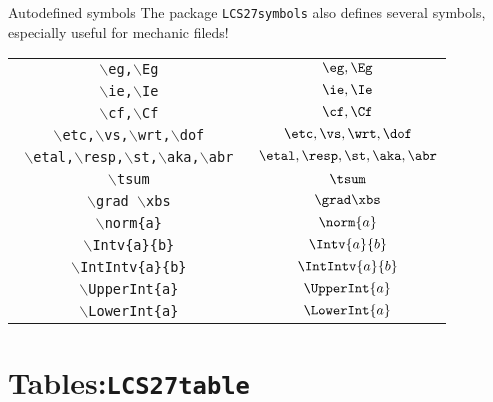 \documentclass[aspectratio=169]{beamer}
\begin{document}
\begin{frame}{Autodefined symbols}
The package \texttt{LCS27symbols} also defines several symbols, especially useful for mechanic fileds!
\begin{table}[h]
\centering
\begin{tabular}{|c|c|}
\hline

\texttt{    $\backslash$eg,$\backslash$Eg   } & $     \eg,\Eg   $\\
\texttt{    $\backslash$ie,$\backslash$Ie   } & $     \ie,\Ie   $\\
\texttt{    $\backslash$cf,$\backslash$Cf   } & $     \cf,\Cf   $\\
\texttt{   $\backslash$etc,$\backslash$vs,$\backslash$wrt,$\backslash$dof    } & $     \etc,\vs,\wrt,\dof    $\\
\texttt{    $\backslash$etal,$\backslash$resp,$\backslash$st,$\backslash$aka,$\backslash$abr } & $     \etal,\resp,\st,\aka,\abr $\\
\texttt{    $\backslash$tsum } & $     \tsum $\\
\texttt{    $\backslash$grad $\backslash$xbs    } & $     \grad \xbs    $\\
\texttt{    $\backslash$norm\{a\}  } & $     \norm{a}  $\\
\texttt{$\backslash$Intv\{a\}\{b\}}&$\Intv{a}{b}$\\
\texttt{$\backslash$IntIntv\{a\}\{b\}}&$\IntIntv{a}{b}$\\
\texttt{$\backslash$UpperInt\{a\}}&$\UpperInt{a}$\\
\texttt{$\backslash$LowerInt\{a\}}&$\LowerInt{a}$\\
\hline
\end{tabular}
\end{table}
\end{frame}

\section{Tables:\texttt{LCS27table}}
\end{document}
